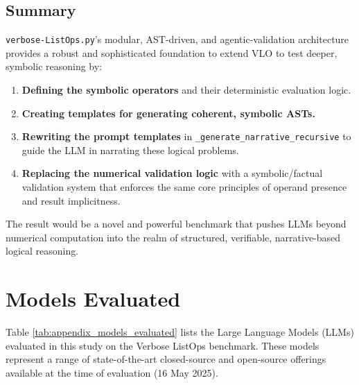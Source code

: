 \documentclass{article}
\begin{document}
\subsection{Summary}

\texttt{verbose-ListOps.py}'s modular, AST-driven, and agentic-validation architecture provides a robust and sophisticated foundation to extend VLO to test deeper, symbolic reasoning by:

\begin{enumerate}
  \item \textbf{Defining the symbolic operators} and their deterministic evaluation logic.
  \item \textbf{Creating templates for generating coherent, symbolic ASTs.}
  \item \textbf{Rewriting the prompt templates} in \texttt{\_generate\_narrative\_recursive} to guide the LLM in narrating these logical problems.
  \item \textbf{Replacing the numerical validation logic} with a symbolic/factual validation system that enforces the same core principles of operand presence and result implicitness.
\end{enumerate}

The result would be a novel and powerful benchmark that pushes LLMs beyond numerical computation into the realm of structured, verifiable, narrative-based logical reasoning.

\section{Models Evaluated}
\label{app:models_evaluated}
Table \ref{tab:appendix_models_evaluated} lists the Large Language Models (LLMs) evaluated in this study on the Verbose ListOps benchmark. These models represent a range of state-of-the-art closed-source and open-source offerings available at the time of evaluation (16 May 2025).
\end{document}
